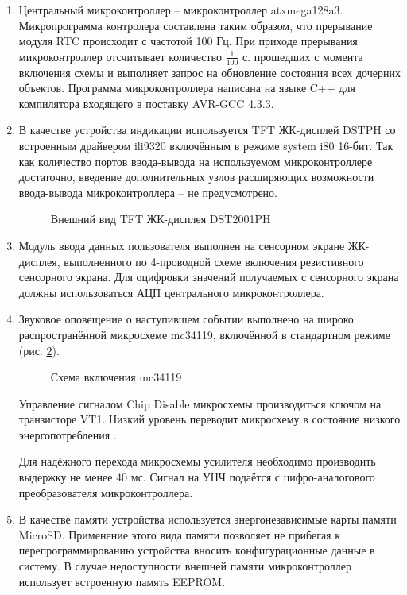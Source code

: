 \begin{enumerate}
	\item Центральный микроконтроллер -- микроконтроллер atxmega128a3. Микропрограмма контролера
	составлена таким образом, что прерывание модуля RTC происходит с частотой 100 Гц.
	При приходе прерывания микроконтроллер отсчитывает количество $ \frac{1}{100} $ с. прошедших с момента
	включения схемы и выполняет запрос на обновление состояния всех дочерних объектов.
	Программа микроконтроллера написана на языке C++ для компилятора входящего в поставку
	AVR-GCC 4.3.3.
	
	\item В качестве устройства индикации используется TFT ЖК-дисплей DST\-PH \cite{display} со встроенным
	драйвером ili9320 включённым в режиме system i80 16-бит\cite{ili9320}.
	Так как количество портов ввода\--вывода на используемом микроконтроллере достаточно, введение дополнительных узлов
	расширяющих возможности ввода\--вывода микроконтроллера -- не предусмотрено.
	\begin{figure}[ht]
		\caption{Внешний вид TFT ЖК-дисплея DST2001PH}
		\label{img:iili9320}
	\end{figure}
	
	\item Модуль ввода данных пользователя выполнен на сенсорном экране ЖК-дисплея,
	выполненного по 4-проводной схеме включения резистивного сенсорного экрана. Для
	оцифровки значений получаемых с сенсорного экрана должны использоваться АЦП\cite{avradc} центрального
	микроконтроллера.
	
	\item Звуковое оповещение о наступившем событии выполнено на широко распространённой
	микросхеме mc34119, включённой в стандартном режиме (рис. \ref{img:mc34119m}).
	\begin{figure}[ht]
		\caption{Схема включения mc34119}
		\label{img:mc34119m}
	\end{figure}
	Управление сигналом Chip Disable микросхемы производиться ключом на транзисторе VT1. Низкий уровень
	переводит микросхему в состояние низкого энергопотребления \cite{mc34119}.
	
	Для надёжного перехода микросхемы усилителя необходимо производить выдержку не менее 40 мс.
	Сигнал на УНЧ подаётся с цифро-аналогового преобразователя микроконтроллера.
	
	\item В качестве памяти устройства используется энергонезависимые карты памяти MicroSD.
	Применение этого вида памяти позволяет не прибегая к перепрограммированию устройства
	вносить конфигурационные данные в систему. В случае недоступности внешней памяти микроконтроллер использует
	встроенную память EEPROM.
	

\end{enumerate}
